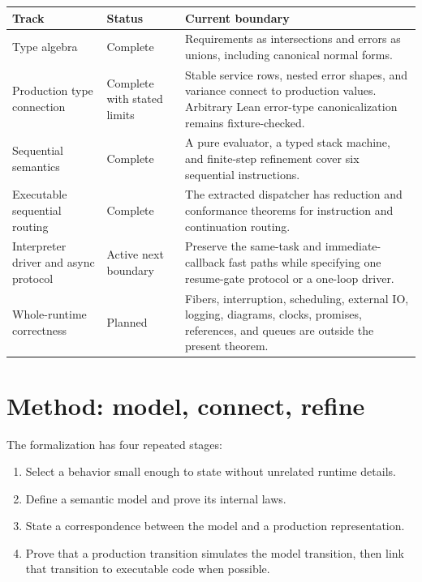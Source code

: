 \begin{center}
\begin{tabular}{p{}p{}p{}}
\textbf{Track} & \textbf{Status} & \textbf{Current boundary} \\
\hline
Type algebra & Complete & Requirements as intersections and errors as unions,
  including canonical normal forms. \\
Production type connection & Complete with stated limits & Stable service rows,
  nested error shapes, and variance connect to production values. Arbitrary
  Lean error-type canonicalization remains fixture-checked. \\
Sequential semantics & Complete & A pure evaluator, a typed stack machine,
  and finite-step refinement cover six sequential instructions. \\
Executable sequential routing & Complete & The extracted dispatcher has
  reduction and conformance theorems for instruction and continuation routing.
  \\
Interpreter driver and async protocol & Active next boundary & Preserve the
  same-task and immediate-callback fast paths while specifying one resume-gate
  protocol or a one-loop driver. \\
Whole-runtime correctness & Planned & Fibers, interruption, scheduling,
  external IO, logging, diagrams, clocks, promises, references, and queues
  are outside the present theorem. \\
\end{tabular}
\end{center}

\section{Method: model, connect, refine}

The formalization has four repeated stages:

\begin{enumerate}
  \item Select a behavior small enough to state without unrelated runtime
    details.
  \item Define a semantic model and prove its internal laws.
  \item State a correspondence between the model and a production
    representation.
  \item Prove that a production transition simulates the model transition,
    then link that transition to executable code when possible.
\end{enumerate}

